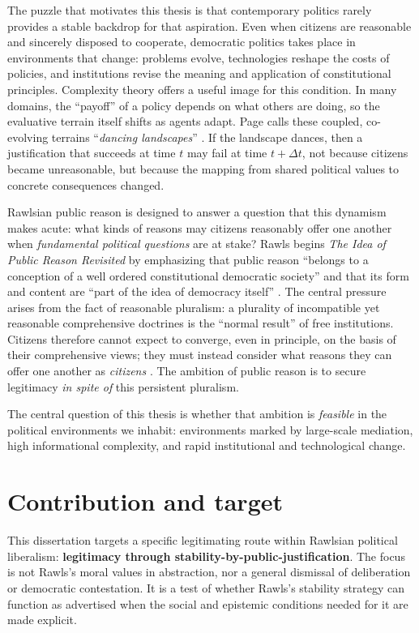 \documentclass[12pt]{report}
\begin{document}
The puzzle that motivates this thesis is that contemporary politics rarely provides a stable backdrop for that aspiration.  Even when citizens are reasonable and sincerely disposed to cooperate, democratic politics takes place in environments that change: problems evolve, technologies reshape the costs of policies, and institutions revise the meaning and application of constitutional principles.  Complexity theory offers a useful image for this condition.  In many domains, the ``payoff'' of a policy depends on what others are doing, so the evaluative terrain itself shifts as agents adapt.  Page calls these coupled, co-evolving terrains ``\emph{dancing landscapes}'' \parencite[p.~94]{page2011diversity}.  If the landscape dances, then a justification that succeeds at time $t$ may fail at time $t+\Delta t$, not because citizens became unreasonable, but because the mapping from shared political values to concrete consequences changed.

Rawlsian public reason is designed to answer a question that this dynamism makes acute: what kinds of reasons may citizens reasonably offer one another when \emph{fundamental political questions} are at stake?  Rawls begins \emph{The Idea of Public Reason Revisited} by emphasizing that public reason ``belongs to a conception of a well ordered constitutional democratic society'' and that its form and content are ``part of the idea of democracy itself'' \parencite[p.~765]{rawls1997public}.  The central pressure arises from the fact of reasonable pluralism: a plurality of incompatible yet reasonable comprehensive doctrines is the ``normal result'' of free institutions.  Citizens therefore cannot expect to converge, even in principle, on the basis of their comprehensive views; they must instead consider what reasons they can offer one another as \emph{citizens} \parencite[p.~766]{rawls1997public}.  The ambition of public reason is to secure legitimacy \emph{in spite of} this persistent pluralism.

The central question of this thesis is whether that ambition is \emph{feasible} in the political environments we inhabit: environments marked by large-scale mediation, high informational complexity, and rapid institutional and technological change.

\section{Contribution and target}

This dissertation targets a specific legitimating route within Rawlsian political liberalism: \textbf{legitimacy through stability-by-public-justification}.  The focus is not Rawls's moral values in abstraction, nor a general dismissal of deliberation or democratic contestation.  It is a test of whether Rawls's stability strategy can function as advertised when the social and epistemic conditions needed for it are made explicit.
\end{document}
